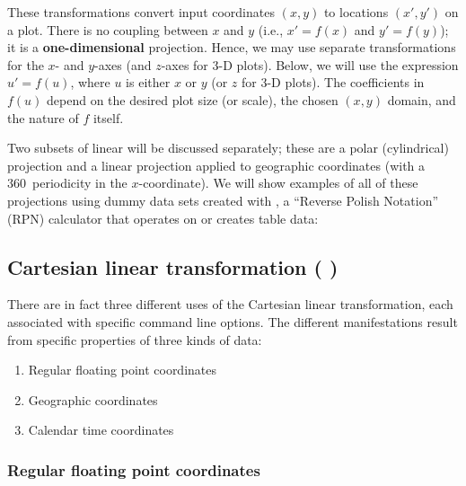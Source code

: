 These transformations convert input coordinates $(x,y)$ to locations $(x', y')$ on a plot.
There is no coupling between $x$ and $y$ (i.e., $x' = f(x)$ and $y' = f(y)$);
it is a \textbf{one-dimensional} projection. Hence, we may use separate transformations
for the $x$- and $y$-axes (and $z$-axes for 3-D plots).   Below, we will use the expression
$u' = f(u)$, where $u$ is either $x$ or $y$ (or $z$ for 3-D plots).
The coefficients in $f(u)$ depend on the desired plot
size (or scale), the chosen $(x,y)$ domain, and the nature of $f$ itself.


Two subsets of linear will be discussed
separately; these are a polar (cylindrical) projection and a linear projection applied to
geographic coordinates (with a 360\DS\ periodicity in the $x$-coordinate).  We will show examples
of all of these projections using dummy data sets created with
, a ``Reverse Polish Notation'' (RPN) calculator that
operates on or creates table data: 



\subsection{Cartesian linear transformation ( )}

There are in fact three different uses of the Cartesian linear transformation, each
associated with specific command line options.  The different manifestations result
from specific properties of three kinds of data:

\begin{enumerate}
\item Regular floating point coordinates
\item Geographic coordinates
\item Calendar time coordinates
\end{enumerate}

\subsubsection{Regular floating point coordinates}

